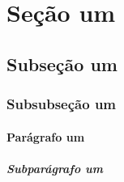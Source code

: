 \documentclass{article}
\begin{document}
\section{Seção um}

\subsection{Subseção um}

\subsubsection{Subsubseção um}

\paragraph{Parágrafo um}

\subparagraph{Subparágrafo um}
\end{document}
